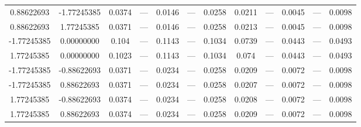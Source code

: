 \documentclass[a4paper,14pt]{extarticle}
\begin{document}
\begin{landscape}
\begin{table}[H]
\begin{tabular}{|c|c|*{5}{c}|*{5}{c}|}
 0.88622693        & -1.77245385        & 0.0374 & ---    & 0.0146 & ---    & 0.0258 & 0.0211 & ---    & 0.0045 & ---    & 0.0098 \\
 0.88622693        &  1.77245385        & 0.0371 & ---    & 0.0146 & ---    & 0.0258 & 0.0213 & ---    & 0.0045 & ---    & 0.0098 \\
-1.77245385        &  0.00000000        & 0.104  & ---    & 0.1143 & ---    & 0.1034 & 0.0739 & ---    & 0.0443 & ---    & 0.0493 \\
 1.77245385        &  0.00000000        & 0.1023 & ---    & 0.1143 & ---    & 0.1034 & 0.074  & ---    & 0.0443 & ---    & 0.0493 \\
-1.77245385        & -0.88622693        & 0.0371 & ---    & 0.0234 & ---    & 0.0258 & 0.0209 & ---    & 0.0072 & ---    & 0.0098 \\
-1.77245385        &  0.88622693        & 0.0371 & ---    & 0.0234 & ---    & 0.0258 & 0.0207 & ---    & 0.0072 & ---    & 0.0098 \\
 1.77245385        & -0.88622693        & 0.0374 & ---    & 0.0234 & ---    & 0.0258 & 0.0208 & ---    & 0.0072 & ---    & 0.0098 \\
 1.77245385        &  0.88622693        & 0.0374 & ---    & 0.0234 & ---    & 0.0258 & 0.0209 & ---    & 0.0072 & ---    & 0.0098 \\
\hline
\end{tabular}
\end{table} 


\end{landscape}
\end{document}
